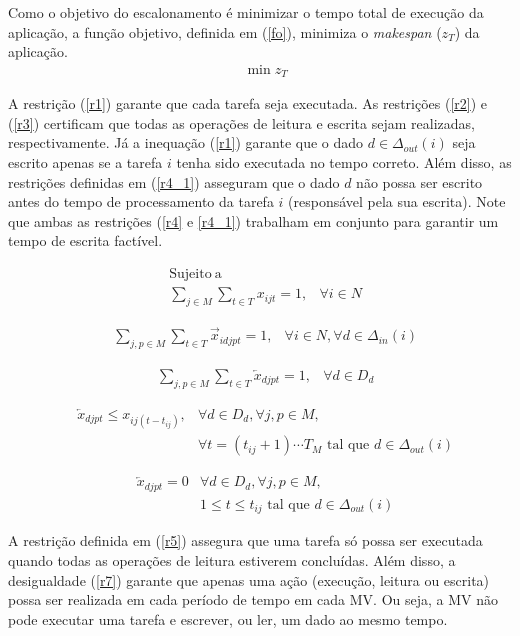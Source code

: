 Como o objetivo do escalonamento é minimizar o tempo total de execução da aplicação, a função objetivo, definida em (\ref{fo}),  minimiza o \textit{makespan} ($z_T$) da aplicação.
\begin{align}
&\min{z_T} \label{fo}
\end{align}


A restrição (\ref{r1}) garante que cada tarefa seja executada. As restrições (\ref{r2}) e (\ref{r3}) certificam que todas as operações de leitura e escrita sejam realizadas, respectivamente. Já a inequação (\ref{r1}) garante que o dado $d \in \Delta_{out}(i)$ seja escrito apenas se a tarefa $i$ tenha sido executada no tempo correto. Além disso, as restrições definidas em (\ref{r4_1}) asseguram que o dado $d$ não possa ser escrito antes do tempo de processamento da tarefa $i$ (responsável pela sua escrita). Note que ambas as restrições (\ref{r4} e \ref{r4_1}) trabalham em conjunto para garantir um tempo de escrita factível.

\begin{align}
&\mathrm{Sujeito\ a\ }  &\nonumber\\
& \sum_{j \in M}\sum_{t \in T} x_{ijt}=1 , & \forall i \in N \label{r1}
\end{align}

\begin{align}
& \sum_{j,p \in M}\sum_{t \in T} \overrightarrow{x}_{idjpt}=1 , & \forall i \in N, \forall d \in \Delta_{in}(i) \label{r2}
\end{align}

\begin{align}
& \sum_{j,p \in M}\sum_{t \in T} \overleftarrow{x}_{djpt}=1 , & \forall d \in D_d \label{r3}
\end{align}

\begin{align}
& \overleftarrow{x}_{djpt} \leq x_{ij(t-t_{ij})} , & \forall d \in D_d, \forall j,p \in M, \nonumber \\ 
&& \forall t = (t_{ij}+1) \cdots T_M  \mbox{ tal que } d \in \Delta_{out}(i)\label{r4}
\end{align}

\begin{align}
& \overleftarrow{x}_{djpt}=0 & \forall d \in D_d, \forall j,p \in M , \nonumber \\ 
&&  1 \leq t \leq t_{ij} \mbox{ tal que } d \in \Delta_{out}(i) \label{r4_1}
\end{align}

A restrição definida em (\ref{r5}) assegura que uma tarefa só possa ser executada quando todas as operações de leitura estiverem concluídas. Além disso, a desigualdade (\ref{r7}) garante que apenas uma ação (execução, leitura ou escrita) possa ser realizada em cada período de tempo em cada MV. Ou seja, a MV não pode executar uma tarefa e escrever, ou ler, um dado ao mesmo tempo.




